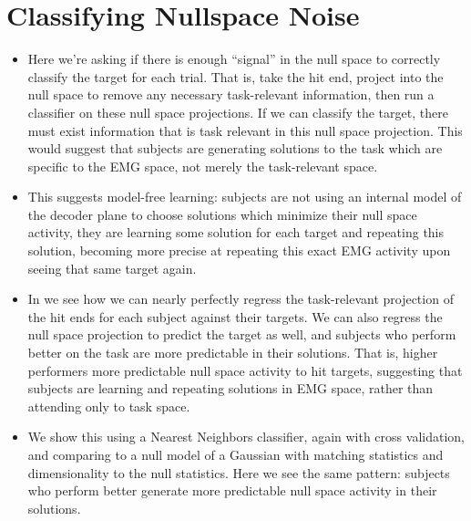 \documentclass[../main.tex]{subfiles}
\begin{document}
\section{Classifying Nullspace Noise}

\begin{itemize}
  \setlength\itemsep{0em}
  \item Here we're asking if there is enough ``signal'' in the null space to correctly classify the target for each trial. That is, take the hit end, project into the null space to remove any necessary task-relevant information, then run a classifier on these null space projections. If we can classify the target, there must exist information that is task relevant in this null space projection. This would suggest that subjects are generating solutions to the task which are specific to the EMG space, not merely the task-relevant space.
  \item This suggests model-free learning: subjects are not using an internal model of the decoder plane to choose solutions which minimize their null space activity, they are learning some solution for each target and repeating this solution, becoming more precise at repeating this exact EMG activity upon seeing that same target again.
  \item In  we see how we can nearly perfectly regress the task-relevant projection of the hit ends for each subject against their targets. We can also regress the null space projection to predict the target as well, and subjects who perform better on the task are more predictable in their solutions. That is, higher performers more predictable null space activity to hit targets, suggesting that subjects are learning and repeating solutions in EMG space, rather than attending only to task space.
  \item We show this using a Nearest Neighbors classifier, again with cross validation, and comparing to a null model of a Gaussian with matching statistics and dimensionality to the null statistics. Here we see the same pattern: subjects who perform better generate more predictable null space activity in their solutions.

\end{itemize}
\end{document}
